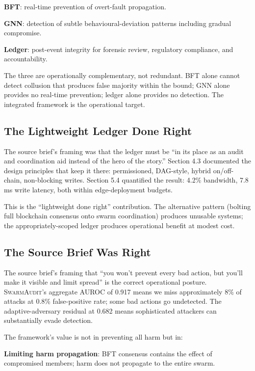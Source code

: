 \documentclass[sigconf,nonacm]{acmart}
\begin{document}
\textbf{BFT}: real-time prevention of overt-fault propagation.

\textbf{GNN}: detection of subtle behavioural-deviation patterns
including gradual compromise.

\textbf{Ledger}: post-event integrity for forensic review,
regulatory compliance, and accountability.

The three are operationally complementary, not redundant. BFT
alone cannot detect collusion that produces false majority within
the bound; GNN alone provides no real-time prevention; ledger
alone provides no detection. The integrated framework is the
operational target.

\subsection{The Lightweight Ledger Done Right}

The source brief's framing was that the ledger must be ``in its
place as an audit and coordination aid instead of the hero of
the story.'' Section 4.3 documented the design principles that
keep it there: permissioned, DAG-style, hybrid on/off-chain,
non-blocking writes. Section 5.4 quantified the result: 4.2\%
bandwidth, 7.8 ms write latency, both within edge-deployment
budgets.

This is the ``lightweight done right'' contribution. The
alternative pattern (bolting full blockchain consensus onto
swarm coordination) produces unusable systems; the
appropriately-scoped ledger produces operational benefit at
modest cost.

\subsection{The Source Brief Was Right}

The source brief's framing that ``you won't prevent every bad
action, but you'll make it visible and limit spread'' is the
correct operational posture. \textsc{SwarmAudit}'s aggregate
AUROC of 0.917 means we miss approximately 8\% of attacks at
0.8\% false-positive rate; some bad actions go undetected. The
adaptive-adversary residual at 0.682 means sophisticated
attackers can substantially evade detection.

The framework's value is not in preventing all harm but in:

\textbf{Limiting harm propagation}: BFT consensus contains the
effect of compromised members; harm does not propagate to the
entire swarm.
\end{document}
